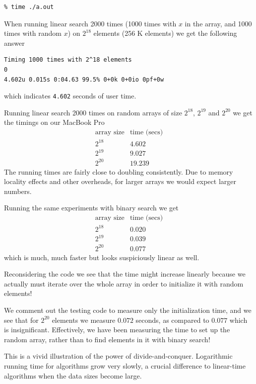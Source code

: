 \begin{lstlisting}[language={[coin]C}]
% cc0 find.c0 find-time.c0
% time ./a.out
\end{lstlisting}
When running linear search 2000 times (1000 times with $x$ in the array,
and 1000 times with random $x$) on $2^{18}$ elements (256 K elements)
we get the following answer
\begin{lstlisting}[language={[coin]C}]
Timing 1000 times with 2^18 elements
0
4.602u 0.015s 0:04.63 99.5%	0+0k 0+0io 0pf+0w
\end{lstlisting}
which indicates \lstinline'4.602' seconds of user time.

Running linear search 2000 times on random arrays of size
$2^{18}$, $2^{19}$ and $2^{20}$ we get the timings on our
MacBook Pro
$$
\begin{array}{cc}
   \text{array size} & \text{time (secs)}
\\            2^{18} & 4.602
\\            2^{19} & 9.027
\\            2^{20} & 19.239
\end{array}
$$
The running times are fairly close to doubling consistently.  Due to
memory locality effects and other overheads, for larger arrays we
would expect larger numbers.

Running the same experiments with binary search we get
$$
\begin{array}{cc}
  \text{array size} & \text{time (secs)}
\\           2^{18} & 0.020
\\           2^{19} & 0.039
\\           2^{20} & 0.077
\end{array}
$$
which is much, much faster but looks suspiciously linear
as well.

Reconsidering the code we see that the time might increase linearly
because we actually must iterate over the whole array in order to
initialize it with random elements!

We comment out the testing code to measure only the initialization
time, and we see that for $2^{20}$ elements we measure $0.072$
seconds, as compared to $0.077$ which is insignificant.
Effectively, we have been measuring the time to set up the random
array, rather than to find elements in it with binary search!

This is a vivid illustration of the power of divide-and-conquer.
Logarithmic running time for algorithms grow very slowly, a crucial
difference to linear-time algorithms when the data sizes become large.

